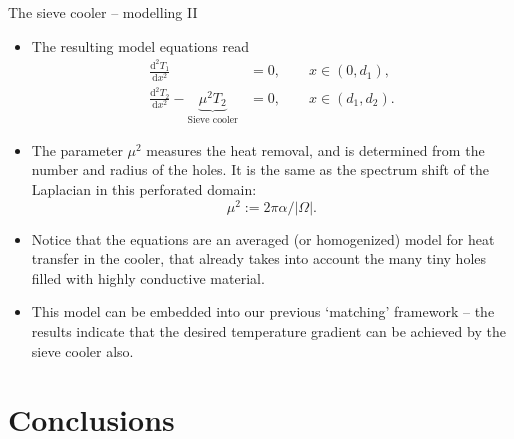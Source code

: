 \documentclass[10pt,mathserif]{beamer}
\newcommand{\mathd}{\mathrm{d}}
\begin{document}
\begin{frame}{The sieve cooler -- modelling II}

\begin{itemize}
\item The resulting model equations read
\begin{align*}
\frac{\mathd^2 T_1}{\mathd x^2}&=0,\qquad x\in (0,d_1), \\
\frac{\mathd^2T_2}{\mathd x^2} - \underbrace{\mu^2 T_2}_{\text{Sieve cooler}}&=0,\qquad x\in (d_1, d_2).
\end{align*}
%
\item The parameter $\mu^2$ measures the heat removal, and is determined  from the number and radius of the holes. It is the same as the spectrum shift of the Laplacian in this perforated domain:
\begin{equation*}
\mu^2:= 2 \pi \alpha/|\Omega|. 
\end{equation*}
%
\item 
Notice that the equations are an averaged (or homogenized) model for heat transfer in the cooler, that already takes into account the many tiny holes filled with highly conductive material.
\item This model can be embedded into our previous `matching' framework -- the results indicate that the desired temperature gradient can be achieved by the sieve cooler also.
\end{itemize}

\end{frame}

\section{Conclusions}
\end{document}

